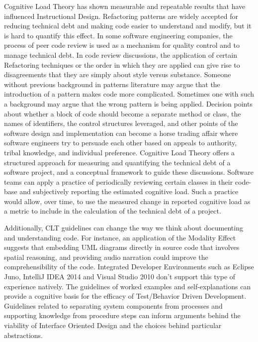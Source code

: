 Cognitive Load Theory has shown measurable and repeatable results that have influenced Instructional Design. Refactoring patterns are widely accepted for reducing technical debt and making code easier to understand and modify, but it is hard to quantify this effect. In some software engineering companies, the process of peer code review is used as a mechanism for quality control and to manage technical debt. In code review discussions, the application of certain Refactoring techniques or the order in which they are applied can give rise to disagreements that they are simply about style versus substance. Someone without previous background in patterns literature may argue that the introduction of a pattern makes code more complicated. Sometimes one with such a background may argue that the wrong pattern is being applied.  Decision points about whether a block of code should become a separate method or class, the names of identifiers, the control structures leveraged, and other points of the software design and implementation can become a horse trading affair where software engineers try to persuade each other based on appeals to authority, tribal knowledge, and individual preference. Cognitive Load Theory offers a structured approach for measuring and quantifying the technical debt of a software project, and a conceptual framework to guide these discussions. Software teams can apply a practice of periodically reviewing certain classes in their code-base and subjectively reporting the estimated cognitive load. Such a practice would allow, over time, to use the measured change in reported cognitive load as a metric to include in the calculation of the technical debt of a project. 

Additionally, CLT guidelines can change the way we think about documenting and understanding code. For instance, an application of the Modality Effect suggests that embedding UML diagrams directly in source code that involves spatial reasoning, and providing audio narration could improve the comprehensibility of the code. Integrated Developer Environments  such as Eclipse Juno, IntelliJ IDEA 2014 and Visual Studio 2010 don’t support this type of experience natively. The guidelines of worked examples and self-explanations can provide a cognitive basis for the efficacy of Test/Behavior Driven Development. Guidelines related to separating system components from processes and supporting knowledge from procedure steps can inform arguments behind the viability of Interface Oriented Design \cite{Pugh2006} and the choices behind particular abstractions.

